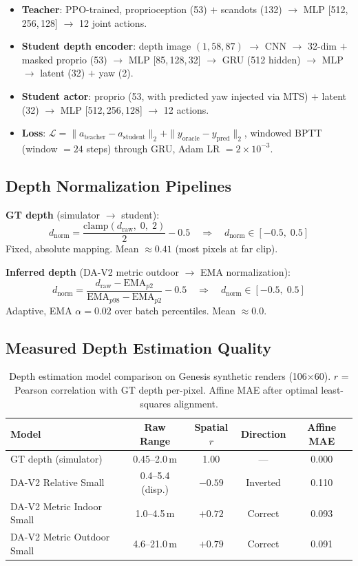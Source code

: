 \documentclass[11pt,a4paper]{article}
\begin{document}
\begin{itemize}[nosep]
  \item \textbf{Teacher}: PPO-trained, proprioception (53) $+$ scandots (132)
        $\to$ MLP [512,\,256,\,128] $\to$ 12 joint actions.
  \item \textbf{Student depth encoder}: depth image $(1, 58, 87)$ $\to$
        CNN $\to$ 32-dim $+$ masked proprio (53) $\to$ MLP [85,\,128,\,32]
        $\to$ GRU (512 hidden) $\to$ MLP $\to$ latent (32) $+$ yaw (2).
  \item \textbf{Student actor}: proprio (53, with predicted yaw injected via
        MTS) $+$ latent (32) $\to$ MLP [512,\,256,\,128] $\to$ 12 actions.
  \item \textbf{Loss}: $\mathcal{L} = \|a_{\text{teacher}} - a_{\text{student}}\|_2
        + \|y_{\text{oracle}} - y_{\text{pred}}\|_2$, windowed BPTT
        (window $= 24$ steps) through GRU, Adam LR $= 2 \times 10^{-3}$.
\end{itemize}

\subsection{Depth Normalization Pipelines}

\textbf{GT depth} (simulator $\to$ student):
\[
  d_{\text{norm}} = \frac{\text{clamp}(d_{\text{raw}},\; 0,\; 2)}{2} - 0.5
  \quad\Rightarrow\quad d_{\text{norm}} \in [-0.5,\; 0.5]
\]
Fixed, absolute mapping.  Mean $\approx 0.41$ (most pixels at far clip).

\textbf{Inferred depth} (DA-V2 metric outdoor $\to$ EMA normalization):
\[
  d_{\text{norm}} = \frac{d_{\text{raw}} - \text{EMA}_{p2}}
                         {\text{EMA}_{p98} - \text{EMA}_{p2}} - 0.5
  \quad\Rightarrow\quad d_{\text{norm}} \in [-0.5,\; 0.5]
\]
Adaptive, EMA $\alpha = 0.02$ over batch percentiles.  Mean $\approx 0.0$.

\subsection{Measured Depth Estimation Quality}

\begin{table}[h]
\centering
\begin{tabular}{lcccc}
\toprule
\textbf{Model} & \textbf{Raw Range} & \textbf{Spatial $r$} & \textbf{Direction} & \textbf{Affine MAE} \\
\midrule
GT depth (simulator)            & 0.45--2.0\,m & 1.00 & --- & 0.000 \\
DA-V2 Relative Small            & 0.4--5.4 (disp.)    & $-0.59$ & Inverted & 0.110 \\
DA-V2 Metric Indoor Small       & 1.0--4.5\,m  & $+0.72$ & Correct & 0.093 \\
DA-V2 Metric Outdoor Small      & 4.6--21.0\,m & $+0.79$ & Correct & 0.091 \\
\bottomrule
\end{tabular}
\caption{Depth estimation model comparison on Genesis synthetic renders (106$\times$60).
$r$ = Pearson correlation with GT depth per-pixel. Affine MAE after optimal least-squares alignment.}
\label{tab:depth_models}
\end{table}
\end{document}
